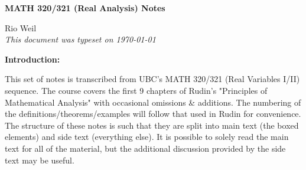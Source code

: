 \documentclass[10pt]{article}
\begin{document}
\begin{tcolorbox}
  \begin{center}
  \begin{Large}
    \textbf{MATH 320/321 (Real Analysis) Notes} \\
    \vspace{5pt}
  \end{Large}
  \begin{large}
        Rio Weil \\
\vspace{5pt}
    \emph{This document was typeset on \today}
  \end{large}
  \end{center}
\end{tcolorbox}

\begin{center}
  \textbf{Introduction:}
  
  This set of notes is transcribed from UBC's MATH 320/321 (Real Variables I/II) sequence. The course covers the first 9 chapters of Rudin's "Principles of Mathematical Analysis" with occasional omissions \& additions. The numbering of the definitions/theorems/examples will follow that used in Rudin for convenience. The structure of these notes is such that they are split into main text (the boxed elements) and side text (everything else). It is possible to solely read the main text for all of the material, but the additional discussion provided by the side text may be useful.
\end{center}
\tableofcontents

\newpage










\end{document}
